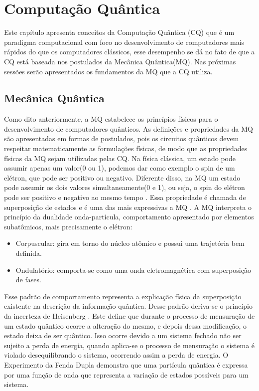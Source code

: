 \documentclass[tcc,capa]{texufpel}
\begin{document}
\chapter{Computação Quântica}\label{cap:comp}



Este capítulo apresenta conceitos da Computação Quântica (CQ) que é um paradigma computacional com foco no desenvolvimento de computadores mais rápidos do que os computadores clássicos, esse desempenho se dá no fato de que a CQ está baseada nos postulados da Mecânica Quântica(MQ). Nas próximas sessões serão apresentados os fundamentos da MQ que a CQ utiliza.
\section{Mecânica Quântica}
Como dito anteriormente, a MQ estabelece os princípios físicos para o desenvolvimento de computadores quânticos. As definições e propriedades da MQ são apresentadas em formas de postulados, pois os circuitos quânticos devem respeitar matematicamente as formulações físicas, de modo que as propriedades físicas da MQ sejam utilizadas pelas CQ.
Na física clássica, um estado pode assumir apenas um valor(0 ou 1), podemos dar como exemplo o spin de um elétron, que pode ser positivo ou negativo. Diferente disso, na MQ um estado pode assumir os dois valores simultaneamente(0 e 1), ou seja, o spin do elétron pode ser positivo e negativo ao mesmo tempo
\cite{PESSOA03}. Essa propriedade é chamada de superposição de estados e é uma das mais expressivas a MQ \cite{MARON10}.
A MQ interpreta o princípio da dualidade onda-partícula, comportamento apresentado por elementos subatômicos, mais precisamente o elétron:
\begin{itemize}
    \item Corpuscular: gira em torno do núcleo atômico e possui uma trajetória bem definida.
    \item Ondulatório: comporta-se como uma onda eletromagnética com superposição de fases.
\end{itemize}
Esse padrão de comportamento representa a explicação física da superposição existente na descrição da informação quântica. Desse padrão deriva-se o princípio da incerteza de Heisenberg \cite{courteille2014mecanica}. Este define que durante o processo de mensuração de um estado quântico ocorre a alteração do mesmo, e depois dessa modificação, o estado deixa de ser quântico. Isso ocorre devido a um sistema fechado não ser sujeito a perda de energia, quando aplica-se o processo de mensuração o sistema é violado desequilibrando o sistema, ocorrendo assim a perda de energia. O Experimento da Fenda Dupla\cite{PESSOA03} demonstra que uma partícula quântica é expressa por uma função de onda que representa a variação de estados possíveis para um sistema.
\end{document}
